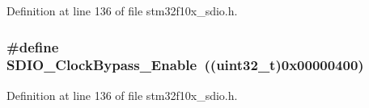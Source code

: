 Definition at line 136 of file stm32f10x\+\_\+sdio.\+h.

\subsubsection[{\texorpdfstring{S\+D\+I\+O\+\_\+\+Clock\+Bypass\+\_\+\+Enable}{SDIO_ClockBypass_Enable}}]{\setlength{\rightskip}{0pt plus 5cm}\#define S\+D\+I\+O\+\_\+\+Clock\+Bypass\+\_\+\+Enable~(({\bf uint32\+\_\+t})0x00000400)}\hypertarget{group___s_d_i_o___clock___bypass_ga5e1e9f7e05ea62dd2315eb556bc10e5c}{}\label{group___s_d_i_o___clock___bypass_ga5e1e9f7e05ea62dd2315eb556bc10e5c}


Definition at line 136 of file stm32f10x\+\_\+sdio.\+h.

